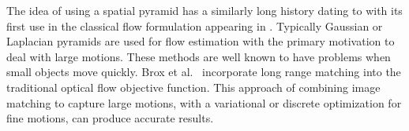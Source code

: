 \documentclass[10pt,twocolumn,letterpaper]{article}
\begin{document}

The idea of using a spatial pyramid has a similarly long history dating to \cite{burt-adelson} with its first use in the classical flow formulation appearing in
\cite{glazer-thesis}. 
Typically Gaussian or Laplacian pyramids are used for flow estimation with the primary motivation to deal with large motions.
These methods are well known to have problems when small objects move quickly.
Brox et al.~\cite{brox2009large} incorporate long range matching into the traditional optical flow objective function.
This approach of combining image matching to capture large motions, with a variational \cite{epicflow} or discrete optimization \cite{guney2016ACCV} for fine motions, can produce accurate results.



\end{document}
